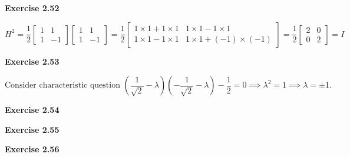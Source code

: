 \documentclass{article}
\begin{document}
\begin{framed}
    \noindent \textbf{Exercise 2.52}
    
    \medskip

    $$
    H^2 = \frac{1}{2}\begin{bmatrix}1 & 1\\ 1 & -1\end{bmatrix}\begin{bmatrix}1 & 1\\ 1 & -1\end{bmatrix} = \frac{1}{2}\begin{bmatrix} 1\times1 + 1\times1 & 1\times1 - 1\times1 \\ 1 \times 1 - 1 \times 1 & 1 \times 1 + (-1)\times(-1)\end{bmatrix} = \frac{1}{2}\begin{bmatrix}2 & 0 \\ 0 & 2\end{bmatrix} = I
    $$
    
\end{framed}

\bigskip

\begin{framed}
    \noindent \textbf{Exercise 2.53}
    
    \medskip
    $$
    \text{Consider characteristic question } (\frac{1}{\sqrt{2}} - \lambda)(-\frac{1}{\sqrt{2}} - \lambda) - \frac{1}{2} = 0 \implies \lambda^2=1 \implies\lambda = \pm 1.
    $$
    
\end{framed}

\bigskip

\begin{framed}
    \noindent \textbf{Exercise 2.54}
    
    \medskip
    
    
\end{framed}

\bigskip

\begin{framed}
    \noindent \textbf{Exercise 2.55}
    
    \medskip
    
    
\end{framed}

\bigskip

\begin{framed}
    \noindent \textbf{Exercise 2.56}
    
    \medskip
    
    
\end{framed}
\end{document}
